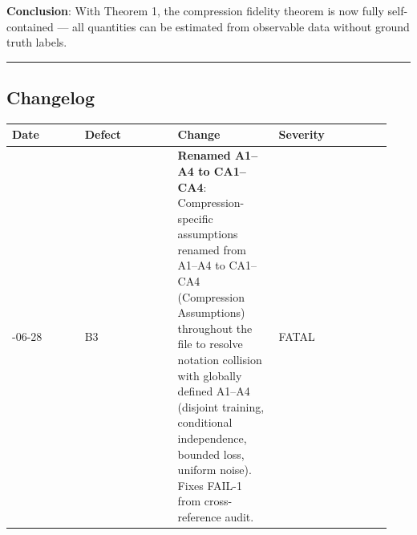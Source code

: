 \documentclass[
  12pt,
]{article}
\begin{document}
\textbf{Conclusion}: With Theorem 1, the compression fidelity theorem is now fully self-contained --- all quantities can be estimated from observable data without ground truth labels.

\begin{center}\rule{0.5\linewidth}{0.5pt}\end{center}

\subsection{Changelog}\label{changelog}

\begin{longtable}[]{@{}p{0.18\linewidth}p{0.23\linewidth}p{0.25\linewidth}p{0.28\linewidth}@{}}
\toprule\noalign{}
\begin{minipage}[b]{\linewidth}\raggedright
Date
\end{minipage} & \begin{minipage}[b]{\linewidth}\raggedright
Defect
\end{minipage} & \begin{minipage}[b]{\linewidth}\raggedright
Change
\end{minipage} & \begin{minipage}[b]{\linewidth}\raggedright
Severity
\end{minipage} \\
\midrule\noalign{}
\endhead
\bottomrule\noalign{}
\endlastfoot
2026-06-28 & B3 & \textbf{Renamed A1--A4 to CA1--CA4}: Compression-specific assumptions renamed from A1--A4 to CA1--CA4 (Compression Assumptions) throughout the file to resolve notation collision with globally defined A1--A4 (disjoint training, conditional independence, bounded loss, uniform noise). Fixes FAIL-1 from cross-reference audit. & FATAL \\
\end{longtable}
\end{document}
